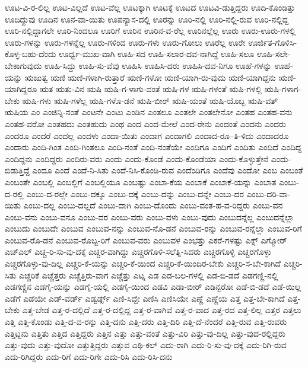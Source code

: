 {ಊಟ-ವಿ-ರ-ಲಿಲ್ಲ
ಊಟ-ವಿಲ್ಲದೆ
ಊಟ-ವೆಲ್ಲ
ಊಟಕ್ಕಾಗಿ
ಊಟಕ್ಕೆ
ಊಟದ
ಊಟವಿ-ಡುತ್ತಿದ್ದರು
ಊದಿ-ಕೊಂಡಿತ್ತು
ಊದಿದ್ದುವು
ಊದಿನ
ಊನ-ವಾ-ಯಿತು
ಊಪನ್ಯಾಸ-ದಲ್ಲಿ
ಊರನ್ನು
ಊರಿ-ನಲ್ಲಿ
ಊರಿ-ನಲ್ಲಿ-ರುವ
ಊರಿ-ನಲ್ಲಿದ್ದ
ಊರಿ-ನಲ್ಲಿದ್ದಾಗಲೇ
ಊರಿ-ನಿಂದಲೂ
ಊರಿಗೆ
ಊರಿನ
ಊರಿನ-ವ-ರೆಲ್ಲ
ಊರಿನಲ್ಲೆಲ್ಲ
ಊರು
ಊರು-ಊರು-ಗಳಲ್ಲಿ
ಊರು-ಗಳನ್ನು
ಊರು-ಗಳನ್ನೆಲ್ಲ
ಊರು-ಗಳಿಂದ
ಊರು-ಗಳು
ಊರು-ಗೋಲು
ಊರೆಲ್ಲ
ಊರೇ
ಊರ್ಜಿತ-ಗೊಳಿಸಿ-ಕೊಳ್ಳ-ಬಹು-ದೆಂದು
ಊರ್ಧ್ವ-ಮುಖ-ವಾಗಿ
ಊಹಿ-ಸದ
ಊಹಿ-ಸಲಾರ-ದವ-ನಾಗಿದ್ದೆ
ಊಹಿ-ಸಲೂ
ಊಹಿ-ಸಲೇ-ಬೇಕಾಗುವುದು
ಊಹಿ-ಸಿದ್ದು
ಊಹಿ-ಸು-ವೆವು
ಊಹಿಸಿ
ಊಹಿಸಿ-ದರು
ಊಹಿಸಿ-ದವ-ನಿಗೂ
ಊಹೆ-ಗಳನ್ನು
ಊಹೆ-ಯನ್ನು
ಋಜುತ್ವ
ಋಣಿ
ಋಣಿ-ಗಳಾಗಿ-ರುತ್ತಾರೆ
ಋಣಿ-ಗಳೋ
ಋಣಿ-ಯಾಗಿ-ರು-ವುದು
ಋಣಿ-ಯಾಗಿದ್ದನು
ಋಣಿ-ಯಾಗಿದ್ದರೂ
ಋತ
ಋತು-ವಿನ
ಋಷಿ
ಋಷಿ-ಗ-ಳಾಗು-ವಂತೆ
ಋಷಿ-ಗಳ
ಋಷಿ-ಗಳಂತೆ
ಋಷಿ-ಗಳಲ್ಲಿ
ಋಷಿ-ಗಳಾಗ-ಬೇಕು
ಋಷಿ-ಗಳು
ಋಷಿ-ಗಳೆಲ್ಲ
ಋಷಿ-ಗಳೊ-ಡನೆ
ಋಷಿ-ಬೀರ್
ಋಷಿ-ಯಂತೆ
ಋಷಿ-ಯೊಬ್ಬ
ಋಷಿ-ವತ್
ಋಷಿಯ
ಎಂ
ಎಂಜಿನ್ನಿ-ನಂತೆ
ಎಂಟನೇ
ಎಂಟು
ಎಂಡಿನ
ಎಂತಲೂ
ಎಂತಲೇ
ಎಂತಲೇನೋ
ಎಂತಹ
ಎಂತಹ-ವನು
ಎಂತಹ-ವರೋ
ಎಂತಹದು
ಎಂತಹುದು
ಎಂಥ
ಎಂದ
ಎಂದ-ಮೇಲೆ
ಎಂದ-ರೇನು
ಎಂದಂತೆ
ಎಂದನು
ಎಂದರು
ಎಂದರೂ
ಎಂದರೆ
ಎಂದಲ್ಲ
ಎಂದಳು
ಎಂದಾ-ಯಿತು
ಎಂದಾಗ
ಎಂದಾಗಲಿ
ಎಂದಾದ-ರೂ--ತಿ-ಳಿದು
ಎಂದಾದರೂ
ಎಂದಾರು
ಎಂದಿ-ಗಿಂತ
ಎಂದಿ-ಗಿಂತಲೂ
ಎಂದಿ-ನಂತೆ
ಎಂದಿ-ನಂತೆಯೇ
ಎಂದಿಗೂ
ಎಂದಿಗೆ
ಎಂದಿತು
ಎಂದಿದೆ
ಎಂದಿದ್ದ
ಎಂದಿದ್ದನು
ಎಂದಿದ್ದರು
ಎಂದಿರು-ವರು
ಎಂದು
ಎಂದು-ಕೊಂಡೆ
ಎಂದು-ಕೊಂಡೆಯಾ
ಎಂದು-ಕೊಳ್ಳುತ್ತೇನೆ
ಎಂದು-ಬಿಡುತ್ತಿದ್ದೆ
ಎಂದೂ
ಎಂದೆ
ಎಂದೆ-ನಿ-ಸಿತು
ಎಂದೆ-ನಿಸಿ-ಕೊಂಡಿ-ರುವ
ಎಂದೆಂದಿಗೂ
ಎಂದೆವು
ಎಂದೋ
ಎಂಬ
ಎಂಬಂತೆ
ಎಂಬಂತೇ
ಎಂಬಲ್ಲಿ
ಎಂಬಲ್ಲಿಗೆ
ಎಂಬಲ್ಲಿಯೂ
ಎಂಬಷ್ಟು
ಎಂಬಾ-ಕೆಯ
ಎಂಬಾಕೆ
ಎಂಬಾಕೆ-ಯನ್ನು
ಎಂಬಾತ
ಎಂಬು-ದ-ರಲ್ಲಿ
ಎಂಬು-ದ-ರಲ್ಲೇ
ಎಂಬು-ದಕ್ಕೂ
ಎಂಬು-ದಕ್ಕೆ
ಎಂಬು-ದನ್ನು
ಎಂಬು-ದನ್ನೇ
ಎಂಬು-ದರ
ಎಂಬು-ದರಿ-ವಾ-ಯಿತು
ಎಂಬು-ದಲ್ಲ
ಎಂಬು-ದಲ್ಲದೆ
ಎಂಬು-ದಾಗಿ
ಎಂಬು-ದೊಂದು
ಎಂಬು-ವಂತ-ಹ-ವ-ರಿದ್ದರು
ಎಂಬು-ವನ
ಎಂಬು-ವನು
ಎಂಬು-ವನೂ
ಎಂಬು-ವರ
ಎಂಬು-ವರು
ಎಂಬು-ವಳು
ಎಂಬು-ವುದು
ಎಂಬುದನ್ನೆಲ್ಲ
ಎಂಬುದನ್ನೆಲ್ಲಾ
ಎಂಬುದು
ಎಂಬುದೇ
ಎಂಬುವ
ಎಂಬುವ-ನನ್ನು
ಎಂಬುವ-ನೊ-ಡನೆ
ಎಂಬುವ-ರನ್ನು
ಎಂಬುವ-ರನ್ನೆಲ್ಲಾ
ಎಂಬುವ-ರಿಗೆ
ಎಂಬುವ-ರೊ-ಡನೆ
ಎಂಬುವ-ರೊಬ್ಬ-ರಿಗೆ
ಎಂಬುವ-ವರು
ಎಂಬುವಳ
ಎಂಭತ್ತು
ಎಕರೆ-ಗಳಷ್ಟು
ಎಕ್ಸ್
ಎಗ್ಮೋರ್
ಎಚ್ಎಲ್
ಎಚ್ಚ-ರಿ-ಸು-ವು-ದಕ್ಕೆ
ಎಚ್ಚರ-ವಾಗಿದ್ದು
ಎಚ್ಚರಗೊಳಿ-ಸಲೆತ್ನಿ-ಸಿದರು
ಎಚ್ಚರಗೊಳ್ಳಿ
ಎಚ್ಚರಗೊಳ್ಳು
ಎಚ್ಚರಗೊಳ್ಳು-ವು-ದಿಲ್ಲ
ಎಚ್ಚರಿ-ಕೆ-ಯನ್ನು
ಎಚ್ಚರಿ-ಕೆ-ಯಿಂದ
ಎಚ್ಚರಿ-ಕೆ-ಯಿಂದಿರ-ಬೇಕು
ಎಚ್ಚರಿ-ಸ-ಬೇ-ಕಾಗಿದೆ
ಎಚ್ಚರಿ-ಸಿತು
ಎಚ್ಚರಿಕೆ
ಎಚ್ಚೆತ್ತರು
ಎಚ್ಚೆತ್ತಿರು-ವಾಗ
ಎಚ್ಚೆತ್ತು
ಎಟ್ನ
ಎಡ
ಎಡ-ಬಲ-ಗಳಲ್ಲಿ
ಎಡ-ಬಿ-ಡದೆ
ಎಡಗಣ್ಣಿ-ನಲ್ಲಿ
ಎಡಗಣ್ಣಿನ
ಎಡಗೈ-ಯನ್ನು
ಎಡಗೈ-ಯಲ್ಲಿ
ಎಡಗೈ-ಯಿಂದ
ಎಡವಿ
ಎಡಾ-ಬೀರ್
ಎಡಿನ್ಬರೋ
ಎಡೆ-ಬಿ-ಡದೆ
ಎಡೆ-ಯಿಲ್ಲ
ಎಡೆಗೆ
ಎಡೆಯೇ
ಎಡ್-ವರ್ಡ್
ಎಡ್ವರ್ಡ್ಸ್
ಎಣಿ-ಸಿದ್ದೇ
ಎಣಿಸಿ
ಎಣಿಸಿಯೇ
ಎಣ್ಣೆ
ಎಣ್ಣೆಯ
ಎತ್ತ
ಎತ್ತ-ಬೇ-ಕಾಗಿದೆ
ಎತ್ತ-ಬೇಕು
ಎತ್ತ-ಬೇಡ
ಎತ್ತ-ರ-ದಲ್ಲಿದೆ
ಎತ್ತ-ರ-ದಲ್ಲಿದ್ದ
ಎತ್ತ-ರ-ವಾಗಿವೆ
ಎತ್ತ-ರ-ವಾದ
ಎತ್ತ-ರದ
ಎತ್ತ-ಲಿಲ್ಲ
ಎತ್ತರ
ಎತ್ತಲು
ಎತ್ತಿ
ಎತ್ತಿ-ಕೊಂಡು
ಎತ್ತಿ-ದ-ವ-ರನ್ನು
ಎತ್ತಿ-ದನು
ಎತ್ತಿ-ದರು
ಎತ್ತಿ-ದಿರಿ
ಎತ್ತಿ-ದೆ-ನೆಂದರೆ
ಎತ್ತಿ-ರುವ
ಎತ್ತಿ-ರುವರು
ಎತ್ತಿಟ್ಟನು
ಎತ್ತಿತು
ಎತ್ತಿದ
ಎತ್ತಿದ್ದರು
ಎತ್ತಿನ
ಎತ್ತು
ಎತ್ತು-ವಂತೆ
ಎತ್ತು-ವಿರಿ
ಎತ್ತು-ವು-ದಿಲ್ಲ
ಎತ್ತು-ವುದ-ರಲ್ಲಿದ್ದರು
ಎತ್ತು-ವುದು
ಎತ್ತು-ವುದೋ
ಎತ್ತುತ್ತಿದ್ದರು
ಎತ್ತುವ
ಎಥಿ-ಕಲ್
ಎದು-ರಾಗಿ
ಎದು-ರಿ-ಸು-ವು-ದಕ್ಕೆ
ಎದು-ರಿಗಿ-ರುವ
ಎದು-ರಿಗಿದ್ದರು
ಎದು-ರಿಗೆ
ಎದು-ರಿಗೇ
ಎದು-ರಿಸಿ
ಎದು-ರಿಸಿ-ದನು
}
